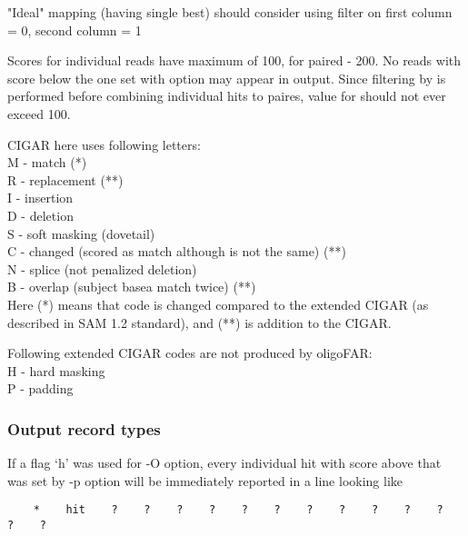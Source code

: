 \documentclass[english]{article}
\begin{document}
    "Ideal" mapping (having single best) should consider using filter on first 
    column = 0, second column = 1

    Scores for individual reads have maximum of 100, for paired - 200. No
    reads with score below the one set with  option may appear in output.
    Since filtering by  is performed before combining individual hits to
    paires, value for  should not ever exceed 100. 

    CIGAR here uses following letters:\\
        M - match (*)\\
        R - replacement (**)\\
        I - insertion\\
        D - deletion\\
        S - soft masking (dovetail)\\
        C - changed (scored as match although is not the same) (**)\\
        N - splice (not penalized deletion)\\
        B - overlap (subject basea match twice) (**)\\
    Here (*) means that code is changed compared to the extended CIGAR
    (as described in SAM 1.2 standard), and (**) is addition to the CIGAR.

    Following extended CIGAR codes are not produced by oligoFAR:\\
        H - hard masking\\
        P - padding

%
%
%
%
%

\subsubsection{Output record types}
    If a flag `h' was used for -O option, every individual hit with score above
    that was set by -p option will be immediately reported in a line looking
    like
	\begin{verbatim}
    *    hit    ?    ?    ?    ?    ?    ?    ?    ?    ?    ?    ?    ?    ?
	\end{verbatim}
\end{document}
